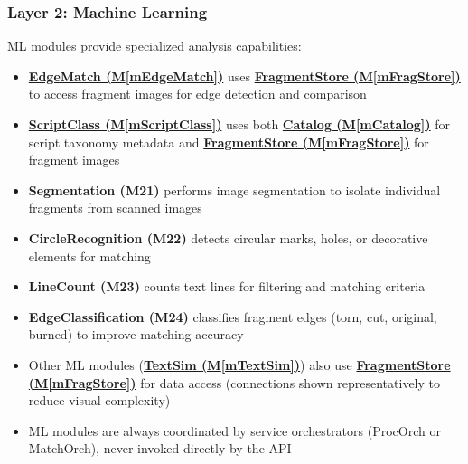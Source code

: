 \documentclass[12pt, titlepage]{article}
\newcommand{\mref}[1]{M\ref{#1}}
\begin{document}
\subsubsection{Layer 2: Machine Learning}
ML modules provide specialized analysis capabilities:
\begin{itemize}
\item \hyperref[mEdgeMatch]{\textbf{EdgeMatch (\mref{mEdgeMatch})}} uses \hyperref[mFragStore]{\textbf{FragmentStore (\mref{mFragStore})}} to access fragment images for edge detection and comparison
\item \hyperref[mScriptClass]{\textbf{ScriptClass (\mref{mScriptClass})}} uses both \hyperref[mCatalog]{\textbf{Catalog (\mref{mCatalog})}} for script taxonomy metadata and \hyperref[mFragStore]{\textbf{FragmentStore (\mref{mFragStore})}} for fragment images
\item \textbf{Segmentation (M21)} performs image segmentation to isolate individual fragments from scanned images
\item \textbf{CircleRecognition (M22)} detects circular marks, holes, or decorative elements for matching
\item \textbf{LineCount (M23)} counts text lines for filtering and matching criteria
\item \textbf{EdgeClassification (M24)} classifies fragment edges (torn, cut, original, burned) to improve matching accuracy
\item Other ML modules (\hyperref[mTextSim]{\textbf{TextSim (\mref{mTextSim})}}) also use \hyperref[mFragStore]{\textbf{FragmentStore (\mref{mFragStore})}} for data access (connections shown representatively to reduce visual complexity)
\item ML modules are always coordinated by service orchestrators (ProcOrch or MatchOrch), never invoked directly by the API
\end{itemize}
\end{document}
